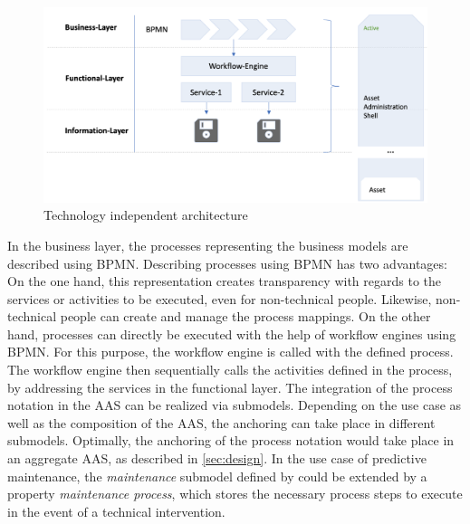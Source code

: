  \begin{figure}[h]
\includegraphics[scale=0.32]{content/pictures/tech_independent_architecture.png}
\caption{Technology independent architecture}
\label{fig:techn-indep-architecture}
\end{figure}

In the business layer, the processes representing the business models are described using \ac{BPMN}. Describing processes using \ac{BPMN} has two advantages: On the one hand, this representation creates transparency with regards to the services or activities to be executed, even for non-technical people. Likewise, non-technical people can create and manage the process mappings. On the other hand, processes can directly be executed with the help of workflow engines using \ac{BPMN}. For this purpose, the workflow engine is called with the defined process. The workflow engine then sequentially calls the activities defined in the process, by addressing the services in the functional layer. The integration of the process notation in the \ac{AAS} can be realized via submodels. Depending on the use case as well as the composition of the \ac{AAS}, the anchoring can take place in different submodels. Optimally, the anchoring of the process notation would take place in an aggregate \ac{AAS}, as described in \ref{sec:design}. In the use case of predictive maintenance, the \textit{maintenance} submodel defined by \citeauthor{Cavalieri2020AShell} could be extended by a property \textit{maintenance process}, which stores the necessary process steps to execute in the event of a technical intervention. 

